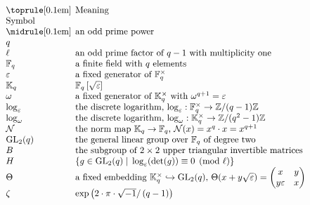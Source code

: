\documentclass[12pt, reqno]{amsart}
\theoremstyle{definition}
\theoremstyle{remark}
\numberwithin{equation}{section}
\newcommand{\BF}{\mathbb{F}}
\newcommand{\BK}{\mathbb{K}}
\newcommand{\BZ}{\mathbb{Z}}
\newcommand{\CN}{\mathcal{N}}
\newcommand{\pt}[1]{\left(#1\right)}
\newcommand{\cb}[1]{\left\{#1\right\}}
\newcommand{\fk}[1]{\left[#1\right]}
\newcommand{\GL}{\mathrm{GL}}
\newcommand{\jz}[4]{{\begin{pmatrix}
		#1&#2\\
		#3&#4
\end{pmatrix}}}
\begin{document}
\[\begin{tabular}{p{2.3cm}p{10.7cm}}
	\toprule[0.1em]
	
	Symbol & Meaning \\
	
	\midrule[0.1em]
	
	
	$q$  & an odd prime power  \\
	
	$\ell$ & an odd prime factor of $q - 1$ with multiplicity one \\
	
	$\BF_q$  & a finite field with $q$ elements  \\
	
	$\varepsilon$ & a fixed generator of $\BF_q^\times$ \\
	
	$\BK_q$  & $\BF_q\fk{\sqrt{\varepsilon}}$  \\
	
	$\omega$ & a fixed generator of $\BK_q^\times$ with $\omega^{q + 1} = \varepsilon$ \\
	
	$\log_\varepsilon$  & the discrete logarithm,  $\log_\varepsilon: \BF_q^\times \rightarrow \BZ/(q - 1)\BZ$  \\
	
	$\log_\omega$ & the discrete logarithm,  $\log_\omega: \BK_q^\times \rightarrow \BZ/(q^2 - 1)\BZ$  \\
	
	$\CN$ & the norm map $\BK_q \rightarrow \BF_q$, $\CN(x) = x^q \cdot x = x^{q + 1}$ \\
	
	$\GL_2(q)$ & the general linear group over $\BF_q$ of degree two \\
	
	$B$ & the subgroup of $2 \times 2$ upper triangular invertible matrices \\
	
	$H$ & $\cb{g \in \GL_2(q) \;|\; \log_\varepsilon(\det(g)) \equiv 0 \pmod{\ell}}$ \\
	
	$\Theta$ & a fixed embedding $\BK_q^\times \hookrightarrow \GL_2(q)$, $\Theta(x + y\sqrt{\varepsilon}) = \jz{x}{y}{y\varepsilon}{x}$ \\
	
	$\zeta$  & $\exp\pt{{2\cdot\pi\cdot\sqrt{-1}}/\pt{q - 1}}$  \\
	

\end{tabular}\]
\end{document}
